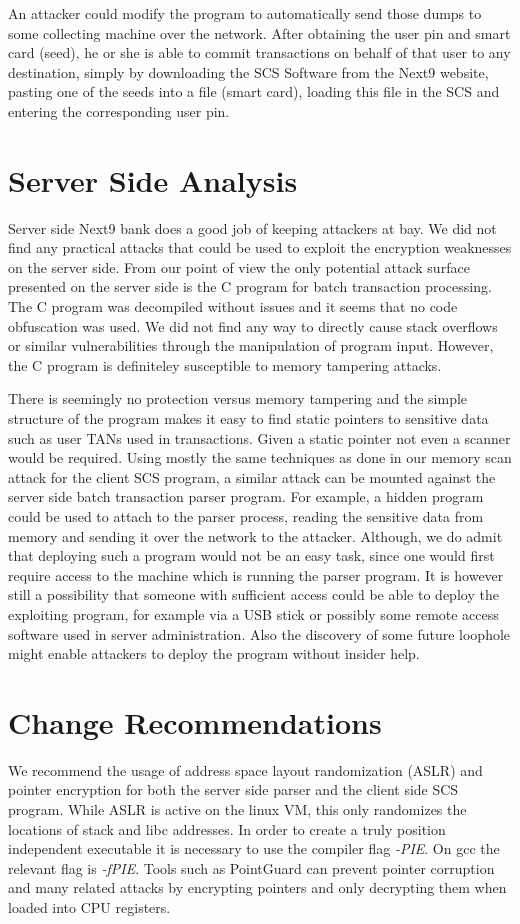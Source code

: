 An attacker could modify the program to automatically send those dumps to some collecting machine over the network. After obtaining the user pin and smart card (seed), he or she is able to commit transactions on behalf of that user to any destination, simply by downloading the SCS Software from the Next9 website, pasting one of the seeds into a file (smart card), loading this file in the SCS and entering the corresponding user pin.

\section{Server Side Analysis}
Server side Next9 bank does a good job of keeping attackers at bay. We did not find any practical attacks that could be used to exploit the encryption weaknesses on the server side. From our point of view the only potential attack surface presented on the server side is the C program for batch transaction processing. The C program was decompiled without issues and it seems that no code obfuscation was used. We did not find any way to directly cause stack overflows or similar vulnerabilities through the manipulation of program input. However, the C program is definiteley susceptible to memory tampering attacks. 

There is seemingly no protection versus memory tampering and the simple structure of the program makes it easy to find static pointers to sensitive data such as user TANs used in transactions. Given a static pointer not even a scanner would be required. Using mostly the same techniques as done in our memory scan attack for the client SCS program, a similar attack can be mounted against the server side batch transaction parser program. For example, a hidden program could be used to attach to the parser process, reading the sensitive data from memory and sending it over the network to the attacker. Although, we do admit that deploying such a program would not be an easy task, since one would first require access to the machine which is running the parser program. It is however still a possibility that someone with sufficient access could be able to deploy the exploiting program, for example via a USB stick or possibly some remote access software used in server administration. Also the discovery of some future loophole might enable attackers to deploy the program without insider help.

\section{Change Recommendations}
We recommend the usage of address space layout randomization (ASLR) and pointer encryption for both the server side parser and the client side SCS program. While ASLR is active on the linux VM, this only randomizes the locations of stack and libc addresses. In order to create a truly position independent executable it is necessary to use the compiler flag \emph{-PIE}. On gcc the relevant flag is \emph{-fPIE}. Tools such as PointGuard can prevent pointer corruption and many related attacks by encrypting pointers and only decrypting them when loaded into CPU registers.

